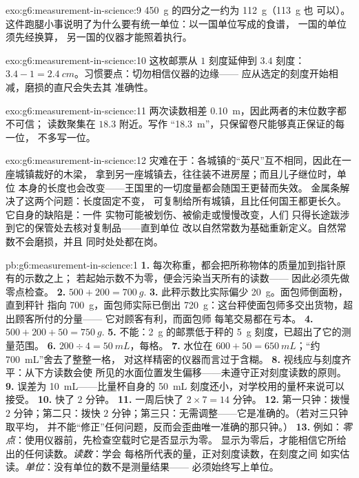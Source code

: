 \begin{solution}{exo:g6:measurement-in-science:9}
\qty{450}{g} 的四分之一约为 \qty{112}{g}（\qty{113}{g} 也
可以）。这件跑腿小事说明了为什么要有统一单位：以一国单位写成的食谱，
一国的单位须先经换算，
另一国的仪器才能照着执行。
\end{solution}

\begin{solution}{exo:g6:measurement-in-science:10}
这枚邮票从 $1$ 刻度延伸到 $3.4$ 刻度：$3.4 - 1 =
\qty{2.4}{cm}$。习惯要点：切勿相信仪器的边缘——
应从选定的刻度开始相减，磨损的直尺会失去其
准确性。
\end{solution}

\begin{solution}{exo:g6:measurement-in-science:11}
两次读数相差 \qty{0.10}{m}，因此两者的末位数字都不可信；
读数聚集在 $18.3$ 附近。写作
“\qty{18.3}{m}”，只保留卷尺能够真正保证的每一位，
不多写一位。
\end{solution}

\begin{solution}{exo:g6:measurement-in-science:12}
灾难在于：各城镇的“英尺”互不相同，因此在一座城镇裁好的木梁，
拿到另一座城镇去，往往装不进房屋；而且儿子继位时，单位
本身的长度也会改变——王国里的一切度量都会随国王更替而失效。
金属条解决了这两个问题：长度固定不变，
可复制给所有城镇，且比任何国王都更长久。它自身的缺陷是：一件
实物可能被划伤、被偷走或慢慢改变，人们
只得长途跋涉到它的保管处去核对复制品——直到单位
改以自然常数为基础重新定义。自然常数不会磨损，并且
同时处处都在岗。
\end{solution}

\begin{solution}{pb:g6:measurement-in-science:1}
\textbf{1.} 每次称重，都会把所称物体的质量加到指针原有的示数之上；
若起始示数不为零，便会污染当天所有的读数——
因此必须先做零点检查。
\textbf{2.} $500 + 200 = \qty{700}{g}$.
\textbf{3.} 此秤示数比实际偏少 \qty{20}{g}。面包师倒面粉，直到秤针
指向 \qty{700}{g}，面包师实际已倒出
\qty{720}{g}：这台秤使面包师多交出货物，超出顾客所付的分量——
它对顾客有利，而面包师
每笔交易都在亏本。
\textbf{4.} $500 + 200 + 50 = \qty{750}{g}$.
\textbf{5.} 不能：\qty{2}{g} 的邮票低于秤的
\qty{5}{g} 刻度，已超出了它的测量范围。
\textbf{6.} $200 \div 4 = \qty{50}{mL}$，每格。
\textbf{7.} 水位在 $600 + 50 = \qty{650}{mL}$；“约
\qty{700}{mL}”舍去了整整一格，
对这样精密的仪器而言过于含糊。
\textbf{8.} 视线应与刻度齐平：从下方读数会使
所见的水面位置发生偏移——未遵守正对刻度读数的原则。
\textbf{9.} 误差为 \qty{10}{mL}——比量杯自身的
\qty{50}{mL} 刻度还小，对学校用的量杯来说可以接受。
\textbf{10.} 快了 $2$ 分钟。
\textbf{11.} 一周后快了 $2 \times 7 = 14$ 分钟。
\textbf{12.} 第一只钟：拨慢 $2$ 分钟；第二只：拨快 $2$
分钟；第三只：无需调整——它是准确的。（若对三只钟取平均，
并不能“修正”任何问题，反而会歪曲唯一准确的那只钟。）
\textbf{13.} 例如：\emph{零点}：使用仪器前，先检查空载时它是否显示为零。
显示为零后，才能相信它所给出的任何读数。\emph{读数}：学会
每格所代表的量，正对刻度读数，在刻度之间
如实估读。\emph{单位}：没有单位的数不是测量结果——
必须始终写上单位。
\end{solution}
